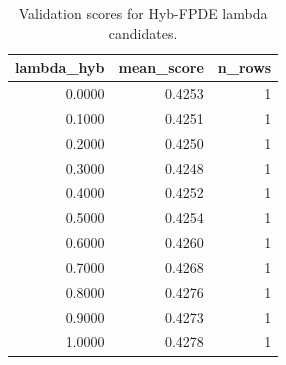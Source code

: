 \begin{table}[t]
\caption{Validation scores for Hyb-FPDE lambda candidates.}
\label{tab:lambda_distribution_computed}
\centering
\begin{tabular}{rrr}
\toprule
lambda\_hyb & mean\_score & n\_rows \\
\midrule
0.0000 & 0.4253 & 1 \\
0.1000 & 0.4251 & 1 \\
0.2000 & 0.4250 & 1 \\
0.3000 & 0.4248 & 1 \\
0.4000 & 0.4252 & 1 \\
0.5000 & 0.4254 & 1 \\
0.6000 & 0.4260 & 1 \\
0.7000 & 0.4268 & 1 \\
0.8000 & 0.4276 & 1 \\
0.9000 & 0.4273 & 1 \\
1.0000 & 0.4278 & 1 \\
\bottomrule
\end{tabular}

\end{table}
